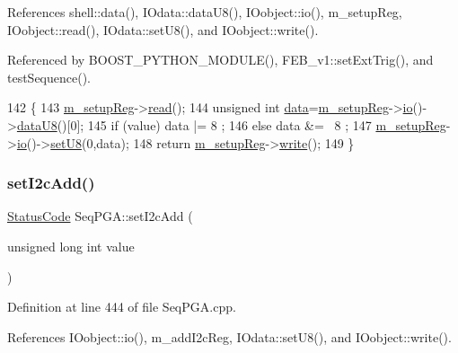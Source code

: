 References shell\+::data(), I\+Odata\+::data\+U8(), I\+Oobject\+::io(), m\+\_\+setup\+Reg, I\+Oobject\+::read(), I\+Odata\+::set\+U8(), and I\+Oobject\+::write().



Referenced by B\+O\+O\+S\+T\+\_\+\+P\+Y\+T\+H\+O\+N\+\_\+\+M\+O\+D\+U\+L\+E(), F\+E\+B\+\_\+v1\+::set\+Ext\+Trig(), and test\+Sequence().


\begin{DoxyCode}
142                                          \{
143   \hyperlink{classSeqPGA_a03269241e7fc26493cd0595beda334c2}{m\_setupReg}->\hyperlink{classIOobject_aa07610c11963b1db6710e3c76ceea456}{read}();
144   \textcolor{keywordtype}{unsigned} \textcolor{keywordtype}{int} \hyperlink{namespaceshell_a5ea2525995cedc3efd69ea8a7f034d1e}{data}=\hyperlink{classSeqPGA_a03269241e7fc26493cd0595beda334c2}{m\_setupReg}->\hyperlink{classIOobject_af04fb94137c3d86849f478ac5afab5d1}{io}()->\hyperlink{classIOdata_a75e9c318dbac3a39402179070943d4bc}{dataU8}()[0];
145   \textcolor{keywordflow}{if} (value) data |=  8 ;
146   \textcolor{keywordflow}{else}       data &= ~8 ;
147   \hyperlink{classSeqPGA_a03269241e7fc26493cd0595beda334c2}{m\_setupReg}->\hyperlink{classIOobject_af04fb94137c3d86849f478ac5afab5d1}{io}()->\hyperlink{classIOdata_a6c4fb2f2af01889ada889c2b7aceb24d}{setU8}(0,data);
148   \textcolor{keywordflow}{return} \hyperlink{classSeqPGA_a03269241e7fc26493cd0595beda334c2}{m\_setupReg}->\hyperlink{classIOobject_a9f6984bc9f0fadcf800f1be2523ac744}{write}();
149 \}
\end{DoxyCode}
\mbox{\label{classSeqPGA_a4ef334e4d2cb417b49033dce951728cd}} 
\subsubsection{\texorpdfstring{set\+I2c\+Add()}{setI2cAdd()}}
{\footnotesize\ttfamily \hyperlink{classStatusCode}{Status\+Code} Seq\+P\+G\+A\+::set\+I2c\+Add (\begin{DoxyParamCaption}\item[{unsigned long int}]{value }\end{DoxyParamCaption})}



Definition at line 444 of file Seq\+P\+G\+A.\+cpp.



References I\+Oobject\+::io(), m\+\_\+add\+I2c\+Reg, I\+Odata\+::set\+U8(), and I\+Oobject\+::write().



